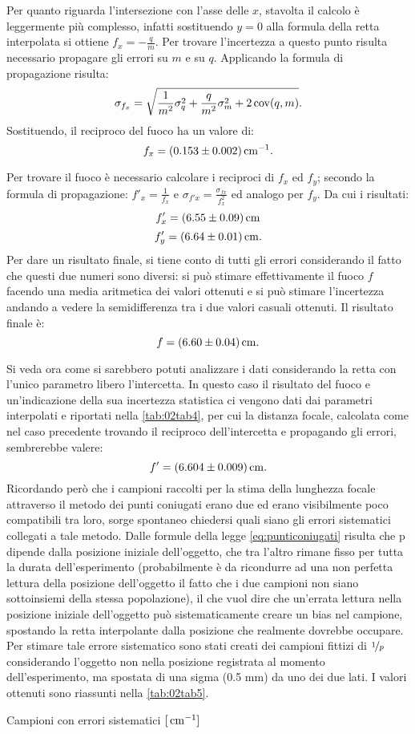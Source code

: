 Per quanto riguarda l'intersezione con l'asse delle $x$, stavolta il calcolo è leggermente più complesso, infatti sostituendo $y = 0$
 alla formula della retta interpolata si ottiene $f_x = -\frac{q}{m}$.  Per trovare l'incertezza a questo punto risulta necessario
 propagare gli errori su $m$ e su $q$. Applicando la formula di propagazione risulta:
\[\sigma_{f_x} = \sqrt {\frac{1} {m^2} \sigma_q^2 + \frac{q}{m^2} \sigma_m^2 + 2 \operatorname{cov} (q,m) }.\] 
 Sostituendo, il reciproco del fuoco ha un valore di:
\[f_x = (0.153 \pm 0.002) \,\mathrm{cm}^{-1}.\]

Per trovare il fuoco è necessario calcolare i reciproci di $f_x$ ed $f_y$; secondo la formula di 
propagazione: $f'_x = \frac{1}{f_x}$ e $\sigma_{f'x} = \frac{\sigma_{fx}}{f_{x}^2}$ ed analogo per $f_y$. Da cui i risultati:
\[f'_x = (6.55 \pm 0.09) \,\mathrm{cm} \]
\[f'_y = (6.64 \pm 0.01) \,\mathrm{cm} .\]
%
Per dare un risultato finale, si tiene conto di tutti gli errori considerando il fatto che questi due numeri sono diversi: si può 
 stimare effettivamente il fuoco $f$ facendo una media aritmetica dei valori ottenuti e si può stimare l'incertezza
 andando a vedere la
 semidifferenza tra i due valori casuali ottenuti. Il risultato finale è:
\[f = (6.60 \pm 0.04) \,\mathrm{cm} .\]

Si veda ora come si sarebbero potuti analizzare i dati considerando la retta con l'unico parametro libero l'intercetta. In questo
 caso il risultato del fuoco e un'indicazione della sua incertezza statistica ci vengono dati dai parametri interpolati e
 riportati nella \autoref{tab:02tab4}, per cui la distanza focale, calcolata come nel caso precedente trovando il reciproco
 dell'intercetta e propagando gli errori, sembrerebbe valere:
\[f' = (6.604 \pm 0.009) \,\mathrm{cm} .\]
Ricordando però che i campioni raccolti per la stima della lunghezza focale attraverso il metodo dei punti coniugati erano due ed
 erano visibilmente poco compatibili tra loro, sorge spontaneo chiedersi quali siano gli errori sistematici collegati a tale metodo.
 Dalle formule della legge \eqref{eq:punticoniugati} risulta che p dipende dalla posizione iniziale dell'oggetto, che tra
 l'altro rimane fisso per tutta la durata dell'esperimento (probabilmente è da ricondurre ad una non perfetta lettura della posizione
 dell'oggetto il fatto che i due campioni non siano sottoinsiemi della stessa popolazione), il che vuol dire che un'errata lettura
 nella posizione iniziale dell'oggetto può sistematicamente creare un bias nel campione, spostando la retta interpolante dalla
 posizione che realmente dovrebbe occupare. Per stimare tale errore sistematico sono stati creati dei campioni fittizi di $\nicefrac{1}{p}$
 considerando l'oggetto non nella posizione registrata al momento dell'esperimento, ma spostata di una sigma (0.5 mm) da
 uno dei due lati. I valori ottenuti sono riassunti nella \autoref{tab:02tab5}.
\begin{tabella}
	\centering
	
	\caption{Campioni con errori sistematici $[\,\mathrm{cm}^{-1}]$}
	\label{tab:02tab5}
\end{tabella}

